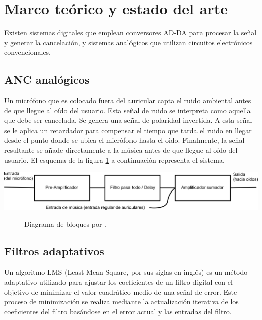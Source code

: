 \documentclass[a4paper,12pt]{article}
\begin{document}
\section{Marco teórico y estado del arte}
\label{sec:background}

Existen sistemas digitales que emplean conversores AD-DA para procesar la señal y generar la cancelación, y sistemas analógicos que utilizan circuitos electrónicos convencionales.

\subsection{ANC analógicos}

Un micrófono que es colocado fuera del auricular capta el ruido ambiental antes de que llegue al oído del usuario.
Esta señal de ruido se interpreta como aquella que debe ser cancelada.
Se genera una señal de polaridad invertida. A esta señal se le aplica un retardador para compensar el tiempo que tarda el ruido en llegar desde el punto donde se ubica el micrófono hasta el oido.
Finalmente, la señal resultante se añade directamente a la música antes de que llegue al oído del usuario.
El esquema de la figura \ref{fig:Kotlicki2016} a continuación representa el sistema.

\begin{center}
    \includegraphics[width=\linewidth]{images/analog_ANC.png}
\end{center}
\vspace{\captionSpace}
\begin{figure}[H]
    \caption{Diagrama de bloques por \textcite{Kotlicki2016}.}
    \label{fig:Kotlicki2016}
\end{figure}

\subsection{Filtros adaptativos}

Un algoritmo LMS (Least Mean Square, por sus siglas en inglés) es un método adaptativo utilizado para ajustar los coeficientes de un filtro digital con el objetivo de minimizar el valor cuadrático medio de una señal de error. Este proceso de minimización se realiza mediante la actualización iterativa de los coeficientes del filtro basándose en el error actual y las entradas del filtro.
\end{document}
